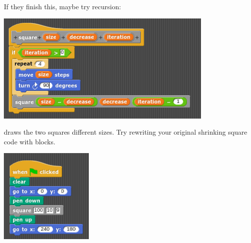 \documentclass[11pt,a4paper]{scrartcl}
\begin{document}
If they finish this, maybe try recursion:
\begin{center}
\includegraphics{shrinking_square_recursion_block.png}
\end{center}
draws the two squares different sizes.  Try rewriting your original
shrinking square code with blocks.
\begin{center}
\includegraphics{shrinking_square_recursion.png}
\end{center}
\end{document}
